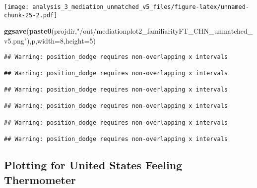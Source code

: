 \documentclass[
]{article}
\newenvironment{Shaded}{\begin{snugshade}}{\end{snugshade}}
\newcommand{\DataTypeTok}[1]{\textcolor[rgb]{0.13,0.29,0.53}{#1}}
\newcommand{\DecValTok}[1]{\textcolor[rgb]{0.00,0.00,0.81}{#1}}
\newcommand{\KeywordTok}[1]{\textcolor[rgb]{0.13,0.29,0.53}{\textbf{#1}}}
\newcommand{\NormalTok}[1]{#1}
\newcommand{\StringTok}[1]{\textcolor[rgb]{0.31,0.60,0.02}{#1}}
\begin{document}
\texttt{[image: analysis\_3\_mediation\_unmatched\_v5\_files/figure-latex/unnamed-chunk-25-2.pdf]}

\begin{Shaded}
\begin{Highlighting}[]
\KeywordTok{ggsave}\NormalTok{(}\KeywordTok{paste0}\NormalTok{(projdir,}\StringTok{"/out/mediationplot2_familiarityFT_CHN_unmatched_v5.png"}\NormalTok{),p,}\DataTypeTok{width=}\DecValTok{8}\NormalTok{,}\DataTypeTok{height=}\DecValTok{5}\NormalTok{)}
\end{Highlighting}
\end{Shaded}

\begin{verbatim}
## Warning: position_dodge requires non-overlapping x intervals

## Warning: position_dodge requires non-overlapping x intervals

## Warning: position_dodge requires non-overlapping x intervals

## Warning: position_dodge requires non-overlapping x intervals

## Warning: position_dodge requires non-overlapping x intervals

## Warning: position_dodge requires non-overlapping x intervals
\end{verbatim}

\hypertarget{plotting-for-united-states-feeling-thermometer}{%
\subsection{Plotting for United States Feeling
Thermometer}\label{plotting-for-united-states-feeling-thermometer}}
\end{document}
